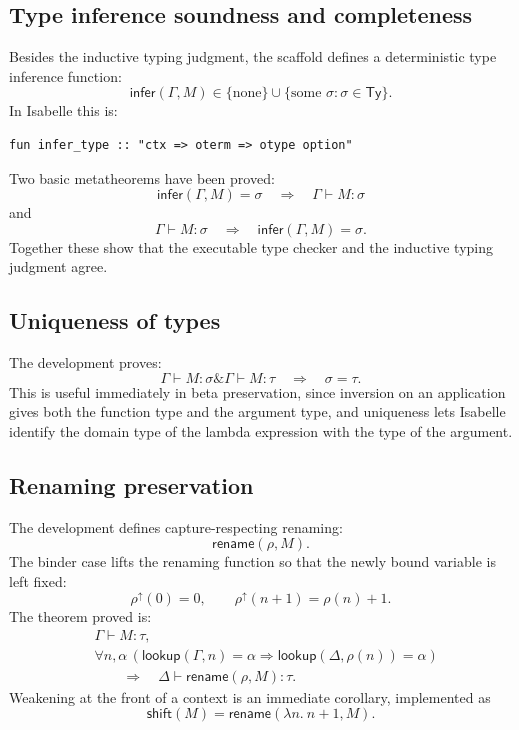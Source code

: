 \documentclass[12pt,leqno]{article}
\newcommand{\AND}{\ensuremath{\mathbin{\&}}}
\newcommand{\oty}{\mathsf{Ty}}
\newcommand{\lookup}{\mathsf{lookup}}
\newcommand{\infer}{\mathsf{infer}}
\newcommand{\rename}{\mathsf{rename}}
\newcommand{\shift}{\mathsf{shift}}
\newcommand{\types}{\mathrel{\vdash}}
\begin{document}
\subsection{Type inference soundness and completeness}

Besides the inductive typing judgment, the scaffold defines a deterministic
type inference function:
\[
  \infer(\Gamma,M)\in\{\text{none}\}\cup\{\text{some }\sigma:\sigma\in\oty\}.
\]
In Isabelle this is:
\begin{verbatim}
fun infer_type :: "ctx => oterm => otype option"
\end{verbatim}

Two basic metatheorems have been proved:
\[
  \infer(\Gamma,M)=\sigma \quad\Rightarrow\quad \Gamma\types M:\sigma
\]
and
\[
  \Gamma\types M:\sigma \quad\Rightarrow\quad \infer(\Gamma,M)=\sigma.
\]
Together these show that the executable type checker and the inductive typing
judgment agree.

\subsection{Uniqueness of types}

The development proves:
\[
  \Gamma\types M:\sigma \AND \Gamma\types M:\tau
  \quad\Rightarrow\quad
  \sigma=\tau.
\]
This is useful immediately in beta preservation, since inversion on an
application gives both the function type and the argument type, and uniqueness
lets Isabelle identify the domain type of the lambda expression with the type
of the argument.

\subsection{Renaming preservation}

The development defines capture-respecting renaming:
\[
  \rename(\rho,M).
\]
The binder case lifts the renaming function so that the newly bound variable is
left fixed:
\[
  \rho^\uparrow(0)=0,\qquad
  \rho^\uparrow(n+1)=\rho(n)+1.
\]
The theorem proved is:
\[
  \begin{aligned}
  &\Gamma\types M:\tau,\\
  &\forall n,\alpha\,
    (\lookup(\Gamma,n)=\alpha \Rightarrow
     \lookup(\Delta,\rho(n))=\alpha)\\
  &\qquad\Rightarrow\quad
  \Delta\types \rename(\rho,M):\tau.
  \end{aligned}
\]
Weakening at the front of a context is an immediate corollary, implemented as
\[
  \shift(M)=\rename(\lambda n.\ n+1,M).
\]
\end{document}
